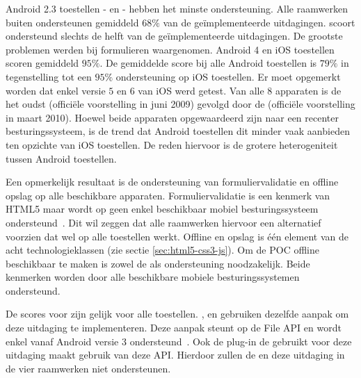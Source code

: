 Android 2.3 toestellen - \htc{} en \gtab{} - hebben het minste ondersteuning.
Alle raamwerken buiten \lungo{} ondersteunen gemiddeld $68\%$ van de geïmplementeerde uitdagingen.
\lungo{} scoort ondersteund slechts de helft van de geïmplementeerde uitdagingen.
De grootste problemen werden bij formulieren waargenomen.
Android 4 en iOS toestellen scoren gemiddeld $95\%$.
De gemiddelde score bij alle Android toestellen is $79\%$ in tegenstelling tot een $95\%$ ondersteuning op iOS toestellen.
Er moet opgemerkt worden dat enkel versie $5$ en $6$ van iOS werd getest.
Van alle $8$ apparaten is de \iphoneiii{} het oudst (officiële voorstelling in juni 2009) gevolgd door de \gs{} (officiële voorstelling in maart 2010). %
Hoewel beide apparaten opgewaardeerd zijn naar een recenter besturingssysteem, is de trend dat Android toestellen dit minder vaak aanbieden ten opzichte van iOS toestellen. %
De reden hiervoor is de grotere heterogeniteit tussen Android toestellen.

Een opmerkelijk resultaat is de ondersteuning van formuliervalidatie en offline opslag op alle beschikbare apparaten.
Formuliervalidatie is een kenmerk van HTML5 maar wordt op geen enkel beschikbaar mobiel besturingssysteem ondersteund~\cite{Deveria2013}.
Dit wil zeggen dat alle raamwerken hiervoor een alternatief voorzien dat wel op alle toestellen werkt.
Offline en opslag is één element van de acht technologieklassen (zie sectie \ref{sec:html5-css3-js}).
Om de POC offline beschikbaar te maken is zowel de  als  ondersteuning noodzakelijk.
Beide kenmerken worden door alle beschikbare mobiele besturingssystemen ondersteund. %

De scores voor  zijn gelijk voor alle toestellen.
\kendo{}, \jqm{} en \lungo{} gebruiken dezelfde aanpak om deze uitdaging te implementeren.
Deze aanpak steunt op de File API en wordt enkel vanaf Android versie 3 ondersteund~\cite{Deveria2013a}.
Ook de plug-in de \st{} gebruikt voor deze uitdaging maakt gebruik van deze API.
Hierdoor zullen de \htc{} en \gtab{} deze uitdaging in de vier raamwerken niet ondersteunen.


